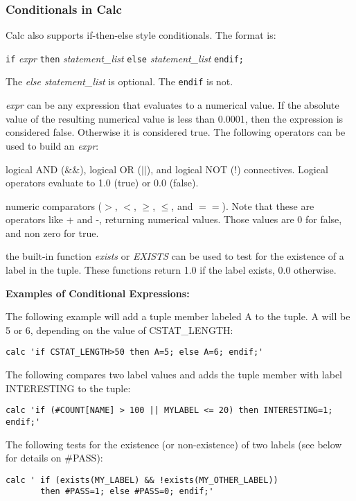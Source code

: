 \documentclass[11pt]{article}
\begin{document}
\subsubsection {Conditionals in Calc}

Calc also supports if-then-else style conditionals.  The format is:

\texttt{if} \textit{expr} \texttt{then} \textit{statement\_list} \texttt{else}
\textit{statement\_list} \texttt{endif;}

The \textit{else statement\_list} is optional.  The \texttt{endif} is not.

\textit{expr} can be any expression that evaluates to a numerical value.  If the absolute value of
the resulting numerical value is less than 0.0001, then the expression is considered false.
Otherwise it is considered true.
The following operators can be used to build an \textit{expr}:
\begin{itemize*}
\item logical AND (\texttt{$\&\&$}), logical OR (\texttt{$||$}), and logical NOT (\texttt{$!$})
connectives.  Logical
operators evaluate to 1.0 (true) or 0.0 (false).
\item numeric comparators ($>$, $<$, $\ge$, $\le$, and $==$).  Note that these are operators like
+ and -, returning numerical values.  Those values are 0 for false, and non zero for true.
\item the built-in function \textit{exists} or \textit{EXISTS} can be used to test for the existence
of a label in the tuple.  These functions return 1.0 if the label exists, 0.0 otherwise.
\end{itemize*}

\textbf{Examples of Conditional Expressions:}

\begin{itemize*}

\item The following example will add a tuple member labeled A to the tuple.  A will be 5 or 6,
depending
on the value of CSTAT\_LENGTH:

\begin{lstlisting}
calc 'if CSTAT_LENGTH>50 then A=5; else A=6; endif;'
\end{lstlisting}

\item The following compares two label values and adds the tuple member with label INTERESTING to
the tuple:

\begin{lstlisting}
calc 'if (#COUNT[NAME] > 100 || MYLABEL <= 20) then INTERESTING=1; endif;'
\end{lstlisting}

\item The following tests for the existence (or non-existence) of two labels (see below for details
on \#PASS):

\begin{lstlisting}
calc ' if (exists(MY_LABEL) && !exists(MY_OTHER_LABEL)) 
       then #PASS=1; else #PASS=0; endif;'
\end{lstlisting}

\end{itemize*}
\end{document}
